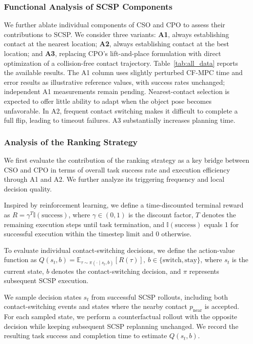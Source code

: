\subsubsection{Functional Analysis of SCSP Components}
\label{sec:component_ablation}
We further ablate individual components of CSO and CPO to assess their contributions to SCSP. We consider three variants: \textbf{A1}, always establishing contact at the nearest location; \textbf{A2}, always establishing contact at the best location; and \textbf{A3}, replacing CPO's lift-and-place formulation with direct optimization of a collision-free contact trajectory. Table~\ref{tab:all_data} reports the available results. The A1 column uses slightly perturbed CF-MPC time and error results as illustrative reference values, with success rates unchanged; independent A1 measurements remain pending. Nearest-contact selection is expected to offer little ability to adapt when the object pose becomes unfavorable. In A2, frequent contact switching makes it difficult to complete a full flip, leading to timeout failures. A3 substantially increases planning time.

\subsubsection{Analysis of the Ranking Strategy}
\label{sec:ranking_ablation}
We first evaluate the contribution of the ranking strategy as a key bridge between CSO and CPO in terms of overall task success rate and execution efficiency through A1 and A2. We further analyze its triggering frequency and local decision quality.

Inspired by reinforcement learning, we define a time-discounted terminal reward as $
R=\gamma^{T}\mathbb{I}(\mathrm{success})$,
where $\gamma\in(0,1)$ is the discount factor, $T$ denotes the remaining execution steps until task termination, and $\mathbb{I}(\mathrm{success})$ equals 1 for successful execution within the timestep limit and 0 otherwise.

To evaluate individual contact-switching decisions, we define the action-value function as $
Q(s_t,b)=\mathbb{E}_{\tau\sim\pi(\cdot\mid s_t,b)}[R(\tau)], \ b\in\{\mathrm{switch},\mathrm{stay}\}$, 
where $s_t$ is the current state, $b$ denotes the contact-switching decision, and $\pi$ represents subsequent SCSP execution.

We sample decision states $s_t$ from successful SCSP rollouts, including both contact-switching events and states where the nearby contact $p_{\mathrm{near}}$ is accepted. For each sampled state, we perform a counterfactual rollout with the opposite decision while keeping subsequent SCSP replanning unchanged. We record the resulting task success and completion time to estimate $Q(s_t,b)$.


